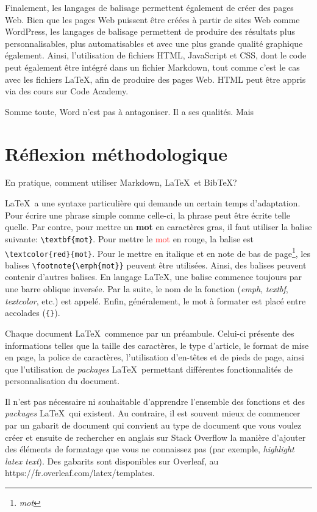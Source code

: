 \documentclass[
  letterpaper,
]{scrbook}
\begin{document}
Finalement, les langages de balisage permettent également de créer des
pages Web. Bien que les pages Web puissent être créées à partir de sites
Web comme WordPress, les langages de balisage permettent de produire des
résultats plus personnalisables, plus automatisables et avec une plus
grande qualité graphique également. Ainsi, l'utilisation de fichiers
HTML, JavaScript et CSS, dont le code peut également être intégré dans
un fichier Markdown, tout comme c'est le cas avec les fichiers \LaTeX,
afin de produire des pages Web. HTML peut être appris via des cours sur
Code Academy.

Somme toute, Word n'est pas à antagoniser. Il a ses qualités. Mais

\hypertarget{ruxe9flexion-muxe9thodologique-1}{%
\section{Réflexion
méthodologique}\label{ruxe9flexion-muxe9thodologique-1}}

En pratique, comment utiliser Markdown, \LaTeX~et BibTeX?

\LaTeX~a une syntaxe particulière qui demande un certain temps
d'adaptation. Pour écrire une phrase simple comme celle-ci, la phrase
peut être écrite telle quelle. Par contre, pour mettre un \textbf{mot}
en caractères gras, il faut utiliser la balise suivante:
\texttt{\textbackslash{}textbf\{mot\}}. Pour mettre le
\textcolor{red}{mot} en rouge, la balise est
\texttt{\textbackslash{}textcolor\{red\}\{mot\}}. Pour le mettre en
italique et en note de bas de page\footnote{\emph{mot}}, les balises
\texttt{\textbackslash{}footnote\{\textbackslash{}emph\{mot\}\}} peuvent
être utilisées. Ainsi, des balises peuvent contenir d'autres balises. En
langage \LaTeX, une balise commence toujours par une barre oblique
inversée. Par la suite, le nom de la fonction (\emph{emph},
\emph{textbf}, \emph{textcolor}, etc.) est appelé. Enfin, généralement,
le mot à formater est placé entre accolades (\texttt{\{\}}).

Chaque document \LaTeX~commence par un préambule. Celui-ci présente des
informations telles que la taille des caractères, le type d'article, le
format de mise en page, la police de caractères, l'utilisation
d'en-têtes et de pieds de page, ainsi que l'utilisation de
\emph{packages} \LaTeX~permettant différentes fonctionnalités de
personnalisation du document.

Il n'est pas nécessaire ni souhaitable d'apprendre l'ensemble des
fonctions et des \emph{packages} \LaTeX~qui existent. Au contraire, il
est souvent mieux de commencer par un gabarit de document qui convient
au type de document que vous voulez créer et ensuite de rechercher en
anglais sur Stack Overflow la manière d'ajouter des éléments de
formatage que vous ne connaissez pas (par exemple, \emph{highlight latex
text}). Des gabarits sont disponibles sur Overleaf, au
https://fr.overleaf.com/latex/templates.
\end{document}
